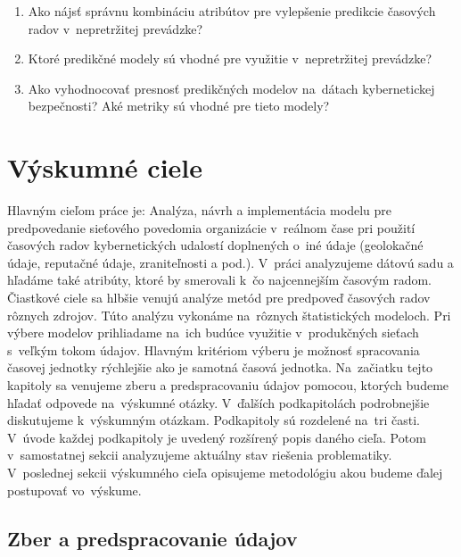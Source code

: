 \documentclass[thesismargins, thesislinespacing, openright, upjsfrontpage]{rnthesis}
\begin{document}
\begin{enumerate}
  \item Ako nájsť správnu kombináciu atribútov pre vylepšenie predikcie časových radov v~nepretržitej prevádzke?
  \item Ktoré predikčné modely sú vhodné pre využitie v~nepretržitej prevádzke?
  \item Ako vyhodnocovať presnosť predikčných modelov na~dátach kybernetickej bezpečnosti? Aké metriky sú vhodné pre tieto modely?
\end{enumerate}


\chapter{Výskumné ciele}

Hlavným cieľom práce je: Analýza, návrh a implementácia modelu pre predpovedanie sieťového povedomia organizácie v~reálnom čase pri použití časových radov kybernetických udalostí doplnených o~iné údaje (geolokačné údaje, reputačné údaje, zraniteľnosti a pod.). V~práci analyzujeme dátovú sadu a hľadáme také atribúty, ktoré by smerovali k~čo najcennejším časovým radom. Čiastkové ciele sa hlbšie venujú analýze metód pre predpoveď časových radov rôznych zdrojov. Túto analýzu vykonáme na~rôznych štatistických modeloch. Pri výbere modelov prihliadame na~ich budúce využitie v~produkčných sieťach s~veľkým tokom údajov. Hlavným kritériom výberu je možnosť spracovania časovej jednotky rýchlejšie ako je samotná časová jednotka. Na~začiatku tejto kapitoly sa venujeme zberu a predspracovaniu údajov pomocou, ktorých budeme hľadať odpovede na~výskumné otázky. V~ďalších podkapitolách podrobnejšie diskutujeme k~výskumným otázkam. Podkapitoly sú rozdelené na~tri časti. V~úvode každej podkapitoly je uvedený rozšírený popis daného cieľa. Potom v~samostatnej sekcii analyzujeme aktuálny stav riešenia problematiky. V~poslednej sekcii výskumného cieľa opisujeme metodológiu akou budeme ďalej postupovať vo~výskume. 

\section{Zber a predspracovanie údajov}
\end{document}
